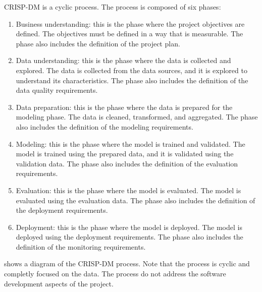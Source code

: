 CRISP-DM is a cyclic process.  The process is composed of six phases:
\begin{enumerate}
  \item Business understanding: this is the phase where the project objectives are
    defined.  The objectives must be defined in a way that is measurable.  The phase also
    includes the definition of the project plan.
  \item Data understanding: this is the phase where the data is collected and explored.
    The data is collected from the data sources, and it is explored to understand its
    characteristics.  The phase also includes the definition of the data quality
    requirements.
  \item Data preparation: this is the phase where the data is prepared for the modeling
    phase.  The data is cleaned, transformed, and aggregated.  The phase also includes the
    definition of the modeling requirements.
  \item Modeling: this is the phase where the model is trained and validated.  The model is
    trained using the prepared data, and it is validated using the validation data.  The
    phase also includes the definition of the evaluation requirements.
  \item Evaluation: this is the phase where the model is evaluated.  The model is evaluated
    using the evaluation data.  The phase also includes the definition of the deployment
    requirements.
  \item Deployment: this is the phase where the model is deployed.  The model is deployed
    using the deployment requirements.  The phase also includes the definition of the
    monitoring requirements.
\end{enumerate}

 shows a diagram of the CRISP-DM process.  Note that the process is
cyclic and completly focused on the data.  The process do not address the software
development aspects of the project.




